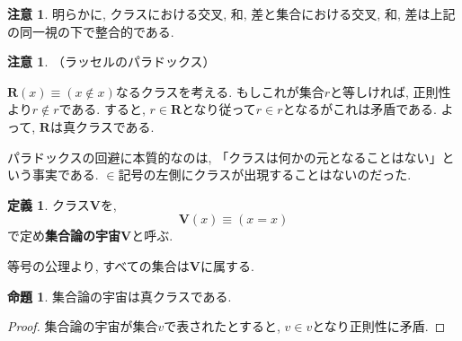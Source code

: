 \documentclass[a4paper, twoside]{bxjsarticle}
\theoremstyle{definition}
\newtheorem{prop}[thm]{命題}
\newtheorem{defn}[thm]{定義}
\newtheorem{rem}[thm]{注意}
\begin{document}
        \begin{rem}
            明らかに, クラスにおける交叉, 和, 差と集合における交叉, 和, 差は上記の同一視の下で整合的である.
        \end{rem}
        \begin{rem}
            （ラッセルのパラドックス）
            
            $\textbf{R}(x) \equiv (x \not \in x)$なるクラスを考える. もしこれが集合$r$と等しければ, 正則性より$r \not \in r$である. すると, $r \in \textbf{R}$となり従って$r \in r$となるがこれは矛盾である. よって, $\textbf{R}$は真クラスである.
            
            パラドックスの回避に本質的なのは, 「クラスは何かの元となることはない」という事実である. $\in$記号の左側にクラスが出現することはないのだった. 
        \end{rem}
        \begin{defn}
            クラス$\textbf{V}$を, \[\textbf{V}(x) \equiv (x=x)\]で定め\textbf{集合論の宇宙V}と呼ぶ.
            
            等号の公理より, すべての集合は$\textbf{V}$に属する.
        \end{defn}
        \begin{prop}
            集合論の宇宙は真クラスである.
        \end{prop}
        \begin{proof}
            集合論の宇宙が集合$v$で表されたとすると, $v\in v$となり正則性に矛盾.
        \end{proof}
\end{document}
